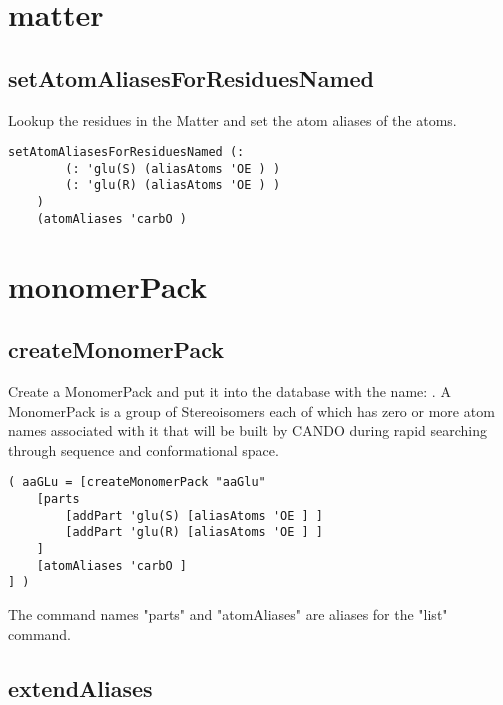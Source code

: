 \begin{itemize}
\section{matter}
\subsection{setAtomAliasesForResiduesNamed}
\par

Lookup the residues in the Matter and set the atom aliases of the atoms.


\begin{verbatim}
setAtomAliasesForResiduesNamed (:
        (: 'glu(S) (aliasAtoms 'OE ) )
        (: 'glu(R) (aliasAtoms 'OE ) )
    )
    (atomAliases 'carbO )
\end{verbatim}

\section{monomerPack}
\subsection{createMonomerPack}
\par
{}\par

Create a MonomerPack and put it into the database with the name: . A MonomerPack is a group of Stereoisomers each of which has zero or more atom names associated with it that will be built by CANDO during rapid searching through sequence and conformational space. 

\begin{verbatim}
( aaGLu = [createMonomerPack "aaGlu"
    [parts
        [addPart 'glu(S) [aliasAtoms 'OE ] ]
        [addPart 'glu(R) [aliasAtoms 'OE ] ]
    ]
    [atomAliases 'carbO ]
] )
\end{verbatim}

The command names "parts" and "atomAliases" are aliases for the "list" command.

\subsection{extendAliases}
\par


\end{itemize}
